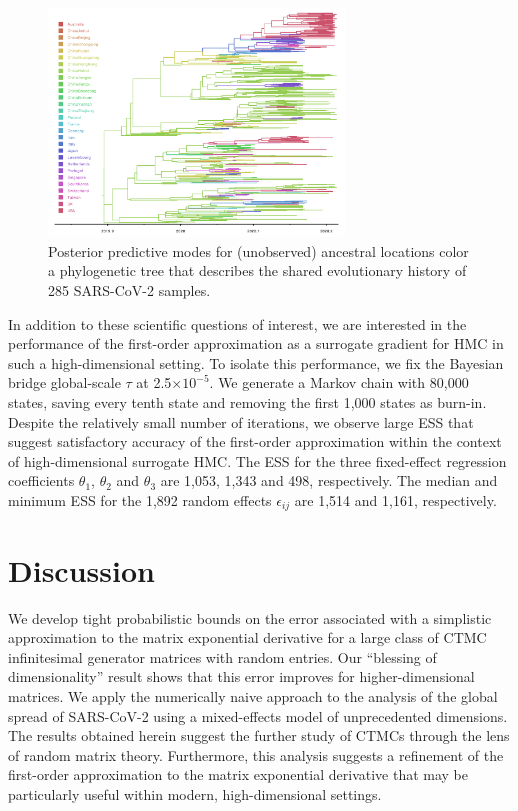 \documentclass[9pt,twocolumn,twoside]{pnas-new}
\newcommand{\?}{\textbf{?}}
\begin{document}
\begin{figure}[!t]
	\centering
	\includegraphics[width=0.7\textwidth]{summary_tree.pdf}
	\vspace{-1em}
	\caption{Posterior predictive modes for (unobserved) ancestral
          locations color a phylogenetic tree that describes the
          shared evolutionary history of 285 SARS-CoV-2
          samples.}\label{fig:tree}
\end{figure}

In addition to these scientific questions of interest, we are
interested in the performance of the first-order approximation as a
surrogate gradient for HMC in such a high-dimensional setting. To
isolate this performance, we fix the Bayesian bridge global-scale
$\tau$ at 2.5$\times10^{-5}$.  We generate a Markov chain with 80,000
states, saving every tenth state and removing the first 1,000 states as
burn-in.  Despite the relatively small number of iterations, we
observe large ESS that suggest satisfactory accuracy of the
first-order approximation within the context of high-dimensional
surrogate HMC.  The ESS for the three fixed-effect regression
coefficients $\theta_1$, $\theta_2$ and $\theta_3$ are 1,053, 1,343
and 498, respectively.  The median and minimum ESS for the 1,892
random effects $\epsilon_{ij}$ are 1,514 and 1,161, respectively.


\section*{Discussion}

We develop tight probabilistic bounds on the error associated
with a simplistic approximation to the matrix exponential derivative
for a large class of CTMC infinitesimal generator matrices with random
entries.  Our ``blessing of dimensionality'' result shows that this
error improves for higher-dimensional matrices.  We apply the
numerically naive approach to the analysis of the global spread of
SARS-CoV-2 using a mixed-effects model of unprecedented dimensions.
The results obtained herein suggest the further study of CTMCs through
the lens of random matrix theory.  Furthermore, this analysis suggests a refinement of the first-order
approximation to the matrix exponential derivative that may be particularly useful within
modern, high-dimensional settings.
\end{document}
